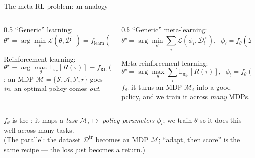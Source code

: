 \begin{frame}{The meta-RL problem: an analogy}
\begin{columns}[t]
\begin{column}{0.5\textwidth}
\centering ``Generic'' learning:
\[ \theta^\star = \arg\min_\theta \mathcal{L}(\theta, \mathcal{D}^{\text{tr}})
   = f_{\text{learn}}(\mathcal{D}^{\text{tr}}) \]
\vspace{0.1em}

\centering Reinforcement learning:
\[ \theta^\star = \arg\max_\theta \mathbb{E}_{\pi_\theta}\!\left[R(\tau)\right]
   = f_{\text{RL}}(\mathcal{M}) \]
{\scriptsize {}: an MDP
$\mathcal{M}=\{\mathcal{S},\mathcal{A},\mathcal{P},r\}$ goes \emph{in}, an optimal policy
comes \emph{out}.}
\end{column}
\begin{column}{0.5\textwidth}
\centering ``Generic'' meta-learning:
\[ \theta^\star = \arg\min_\theta \sum_{i} \mathcal{L}\!\left(\phi_i, \mathcal{D}^{\text{ts}}_i\right),
   \;\; \phi_i = f_\theta(\mathcal{D}^{\text{tr}}_i) \]
\vspace{0.1em}

\centering Meta-reinforcement learning:
\[ \theta^\star = \arg\max_\theta \sum_i \mathbb{E}_{\pi_{\phi_i}}\!\left[R(\tau)\right],
   \;\; \phi_i = f_\theta(\mathcal{M}_i) \]
{\scriptsize {} $f_\theta$: it turns an MDP $\mathcal{M}_i$ into a
good policy, and we train it across \emph{many} MDPs.}
\end{column}
\end{columns}
\vfill
\begin{center}
{\footnotesize $f_\theta$ is the : it maps a \emph{task}
$\mathcal{M}_i \mapsto$ \emph{policy parameters} $\phi_i$; we train $\theta$ so it does this
well across many tasks.}\\[2pt]
{\scriptsize (The parallel: the dataset $\mathcal{D}^{\text{tr}}$ becomes an MDP
$\mathcal{M}$; ``adapt, then score'' is the same recipe --- the loss just becomes a return.)}
\end{center}
\end{frame}

